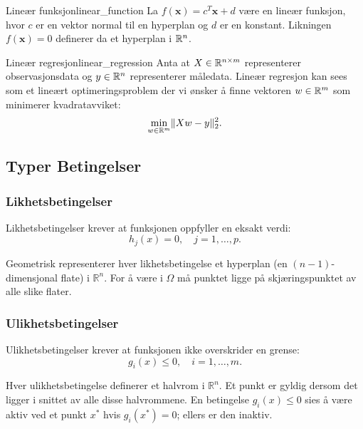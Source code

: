 \begin{example}{Lineær funksjon}{linear_function}
	La \(f(\symbf{x}) = c^T\symbf{x} + d\) være en lineær funksjon, hvor \(c\) er en vektor normal til en hyperplan og \(d\) er en konstant. Likningen \(f(\symbf{x}) = 0\) definerer da et hyperplan i \(\mathbb{R}^n\).
\end{example}

\begin{example}{Lineær regresjon}{linear_regression}
	Anta at \(X \in \mathbb{R}^{n \times m}\) representerer observasjonsdata og \(y \in \mathbb{R}^n\) representerer måledata. Lineær regresjon kan sees som et lineært optimeringsproblem der vi ønsker å finne vektoren \(w \in \mathbb{R}^m\) som minimerer kvadratavviket:
	\begin{equation*}
		\min_{w \in \mathbb{R}^m} \lVert Xw - y\rVert_2^2.
	\end{equation*}
\end{example}

\subsection{Typer Betingelser}

\subsubsection{Likhetsbetingelser}
Likhetsbetingelser krever at funksjonen oppfyller en eksakt verdi:
\begin{equation*}
	h_j(x) = 0, \quad j = 1,\ldots,p.
\end{equation*}

Geometrisk representerer hver likhetsbetingelse et hyperplan (en \((n-1)\)-dimensjonal flate) i \( \mathbb{R}^n \). For å være i \( \Omega \) må punktet ligge på skjæringspunktet av alle slike flater.

\subsubsection{Ulikhetsbetingelser}
Ulikhetsbetingelser krever at funksjonen ikke overskrider en grense:
\begin{equation*}
	g_i(x) \leq 0, \quad i = 1,\ldots,m.
\end{equation*}

Hver ulikhetsbetingelse definerer et halvrom i \( \mathbb{R}^n \). Et punkt er gyldig dersom det ligger i snittet av alle disse halvrommene. En betingelse \( g_i(x) \leq 0 \) sies å være aktiv ved et punkt \( x^* \) hvis \( g_i(x^*) = 0 \); ellers er den inaktiv.

